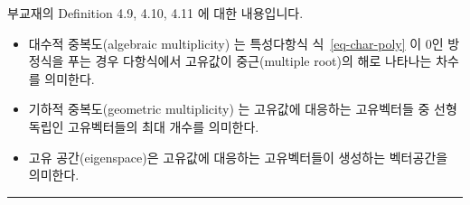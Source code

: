 \documentclass[
  11pt,
  a4paper,
  oneside]{scrbook}
\theoremstyle{definition}
\theoremstyle{definition}
\theoremstyle{plain}
\theoremstyle{remark}
\begin{document}
부교재의 Definition 4.9, 4.10, 4.11 에 대한 내용입니다.

\begin{itemize}
\item
  대수적 중복도(algebraic multiplicity) 는 특성다항식
  식~\ref{eq-char-poly} 이 0인 방정식을 푸는 경우 다항식에서 고유값이
  중근(multiple root)의 해로 나타나는 차수를 의미한다.
\item
  기하적 중복도(geometric multiplicity) 는 고유값에 대응하는 고유벡터들
  중 선형독립인 고유벡터들의 최대 개수를 의미한다.
\item
  고유 공간(eigenspace)은 고유값에 대응하는 고유벡터들이 생성하는
  벡터공간을 의미한다.
\end{itemize}

\begin{center}\rule{0.5\linewidth}{0.5pt}\end{center}
\end{document}
